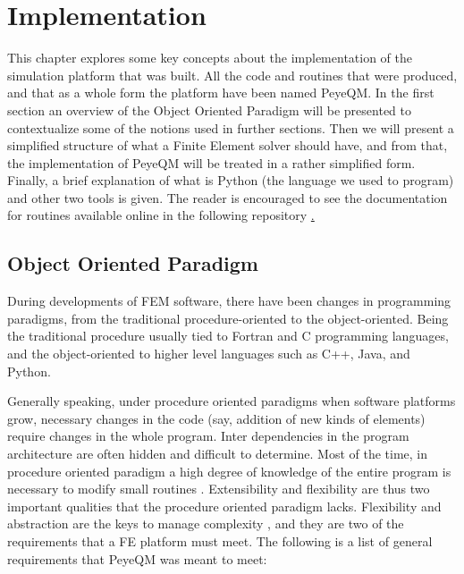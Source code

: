 \chapter{Implementation}
\label{ch:Implementation}

This chapter explores some key concepts about the implementation of the simulation platform that was built. 
All the code and routines that were produced, and that as a whole form the platform have been named PeyeQM.  
In the first section an overview of the Object Oriented Paradigm will be presented to contextualize some of the notions used in further sections. Then we will present a simplified structure of what a Finite Element solver should have, and from that, the implementation of PeyeQM will be treated in a rather simplified form. Finally, a brief explanation of what is Python (the language we used to program) and other two tools is given. The reader is encouraged to see the documentation for routines available online in the following repository \href{https://github.com/bebopsan/peyeQM}.
  
\section{Object Oriented Paradigm}

During developments of FEM software, there have been changes in programming paradigms, from the traditional procedure-oriented to the object-oriented. Being the traditional procedure usually tied to  Fortran and C programming languages, and the object-oriented to higher level languages such as C++, Java, and Python.

Generally speaking, under procedure oriented paradigms when software platforms grow, necessary changes in the code (say, addition of new kinds of elements) require changes in the whole program. Inter dependencies  in the program architecture are often hidden and difficult to determine. Most of the time, in procedure oriented paradigm a high degree of knowledge of the entire program is necessary to modify small routines \cite{Mackerle2004}. Extensibility and flexibility are thus two important qualities that the procedure oriented paradigm lacks. 
Flexibility and abstraction are the keys to manage complexity \cite{Lage1998}, and they are two of the requirements that a FE platform must meet. The following is a list of general requirements that PeyeQM was meant to meet:


